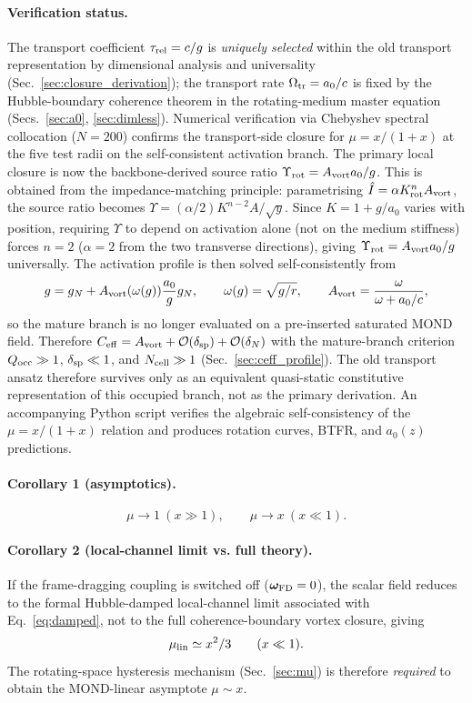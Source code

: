 \documentclass[11pt]{article}
\begin{document}
\paragraph{Verification status.}
The transport coefficient $\tau_{\rm rel}=c/g$ is
\emph{uniquely selected} within the old transport representation
by dimensional analysis and universality
(Sec.~\ref{sec:closure_derivation}); the transport
rate $\Omega_{\rm tr}=a_0/c$ is fixed by the
Hubble-boundary coherence theorem in the rotating-medium master equation
(Secs.~\ref{sec:a0}, \ref{sec:dimless}).  Numerical verification via
Chebyshev spectral collocation ($N=200$) confirms the
transport-side closure for $\mu=x/(1+x)$ at the five
test radii on the self-consistent activation branch.  The primary local closure is now the
backbone-derived source ratio
$\Upsilon_{\rm rot}=A_{\rm vort}a_0/g$.
This is obtained from the impedance-matching principle:
parametrising $\hat I=\alpha K_{\rm rot}^n A_{\rm vort}$,
the source ratio becomes $\Upsilon=({\alpha}/{2})K^{n-2}A/\sqrt{y}$.
Since $K=1+g/a_0$ varies with position, requiring $\Upsilon$ to
depend on activation alone (not on the medium stiffness)
forces $n=2$ ($\alpha=2$ from the two transverse directions),
giving $\Upsilon_{\rm rot}=A_{\rm vort}a_0/g$ universally.
The activation profile is then solved self-consistently from
\[
g=g_N+A_{\rm vort}(\omega(g))\frac{a_0}{g}g_N,
\qquad
\omega(g)=\sqrt{g/r},
\qquad
A_{\rm vort}=\frac{\omega}{\omega+a_0/c},
\]
so the mature branch is no longer evaluated on a pre-inserted saturated
MOND field.
Therefore
$C_{\rm eff}=A_{\rm vort}+\mathcal{O}(\delta_{\rm sp})
+\mathcal{O}(\delta_N)$ with the mature-branch criterion
$Q_{\rm occ}\gg1$, $\delta_{\rm sp}\ll1$, and $N_{\rm cell}\gg1$
(Sec.~\ref{sec:ceff_profile}).
The old transport ansatz therefore survives only as an
equivalent quasi-static constitutive representation of this
occupied branch, not as the primary derivation.
An accompanying Python script verifies the algebraic
self-consistency of the $\mu = x/(1+x)$ relation
and produces rotation curves, BTFR, and $a_0(z)$
predictions.

\paragraph{Corollary 1 (asymptotics).}
\begin{equation}
\mu\to1\ (x\gg1),\qquad
\mu\to x\ (x\ll1).
\label{eq:mu_asym}
\end{equation}

\paragraph{Corollary 2 (local-channel limit vs. full theory).}
If the frame-dragging coupling is switched off ($\bm{\omega}_{\rm FD} = 0$), the scalar field reduces to the formal Hubble-damped local-channel limit associated with Eq.~\eqref{eq:damped}, not to the full coherence-boundary vortex closure, giving
\begin{equation}
\mu_{\rm lin}\simeq x^2/3
\qquad (x\ll1).
\label{eq:mu_lin_local}
\end{equation}
The rotating-space hysteresis mechanism (Sec.~\ref{sec:mu}) is therefore \emph{required} to obtain the MOND-linear asymptote $\mu \sim x$.
\end{document}
